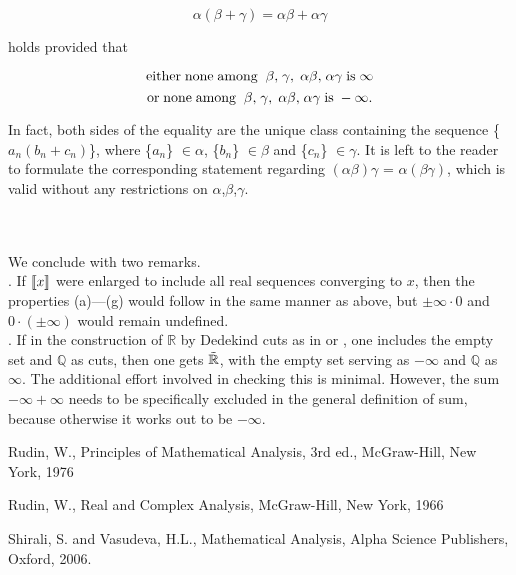 \documentclass{article}
\begin{document}
\[\alpha(\beta+\gamma)=\alpha\beta+\alpha\gamma\]

\noindent holds provided that

\[{\rm either\; none\; among\; \; }\beta {\rm ,\; }\gamma ,{\rm \; }\alpha \beta {\rm ,\; }\alpha \gamma {\rm \; is\; }\infty \]
\[{\rm or\; none\; among\; \; }\beta {\rm ,\; }\gamma ,{\rm \; }\alpha \beta {\rm ,\; }\alpha \gamma {\rm \; is\; }-\infty .\]

\noindent In fact, both sides of the equality are the unique class
containing the sequence \{$a_{n}(b_{n}+c_{n})$\}, where
\{$a_{n}$\} $\in\alpha$, \{$b_{n}$\} $\in\beta$ and
\{$c_{n}$\} $\in\gamma$. It is left to the reader to formulate
the corresponding statement regarding $(\alpha\beta)\gamma$ =
$\alpha(\beta\gamma)$, which is valid without any restrictions
on $\alpha$,$\beta$,$\gamma$.

\paragraph{}\

We conclude with two remarks.\\

. If
$\left[\kern-0.15em\left[x\right]\kern-0.15em\right]$ were
enlarged to include all real sequences converging to $x$,
then the properties (a)---(g) would follow in the same manner as
above, but $\pm\infty\cdot 0$ and $0\cdot (\pm\infty)$
would remain undefined.\\
. If in the construction of $\mathbb{R}$ by Dedekind cuts
as in \cite [pp.17-21]{rudin1} or \cite [pp.47-52]{SV}, one
includes the empty set and $\mathbb{Q}$ as cuts, then one gets
$\tilde{{\bf {\mathbb R}}}$, with the empty set serving as
$-\infty$ and $\mathbb{Q}$ as $\infty$. The additional effort
involved in checking this is minimal. However, the sum
$-\infty+\infty$ needs to be specifically excluded in the general
definition of sum, because otherwise it works out to be $-\infty$.


\begin{thebibliography}{2}



 Rudin, W., Principles of Mathematical Analysis, 3rd ed., McGraw-Hill, New York,
1976

 Rudin, W., Real and Complex Analysis, McGraw-Hill, New York, 1966

 Shirali, S. and Vasudeva, H.L., Mathematical
Analysis, Alpha Science Publishers, Oxford, 2006.







\end{thebibliography}
\end{document}
